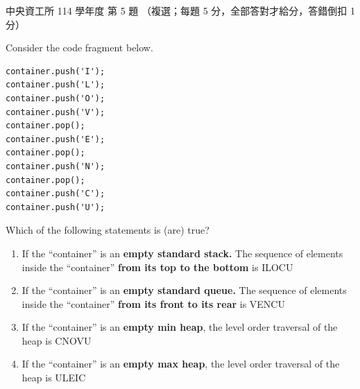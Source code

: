 \begin{pastexam}[label={px:ncu-114-dsa-05}]{中央資工所 114 學年度 第 5 題}
（複選；每題 5 分，全部答對才給分，答錯倒扣 1 分）

Consider the code fragment below.
\begin{center}
\begin{minipage}{5cm}
\begin{verbatim}
container.push('I');
container.push('L');
container.push('O');
container.push('V');
container.pop();
container.push('E');
container.pop();
container.push('N');
container.pop();
container.push('C');
container.push('U');
\end{verbatim}
\end{minipage}
\end{center}
Which of the following statements is (are) true?
\begin{enumerate}[label=(\alph*)]
\item If the ``container'' is an \textbf{empty standard stack.} The sequence of elements inside the
``container'' \textbf{from its top to the bottom} is ILOCU
\item If the ``container'' is an \textbf{empty standard queue.} The sequence of elements inside the
``container'' \textbf{from its front to its rear} is VENCU
\item If the ``container'' is an \textbf{empty min heap}, the level order traversal of the heap is CNOVU
\item If the ``container'' is an \textbf{empty max heap}, the level order traversal of the heap is ULEIC
\end{enumerate}
\end{pastexam}

